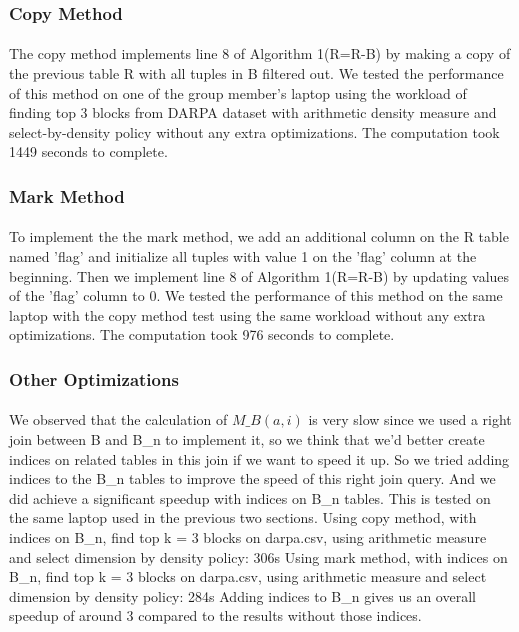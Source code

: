 \subsubsection{Copy Method}
\paragraph{} The copy method implements line 8 of Algorithm 1(R=R-B) by making a copy of the previous table R with all tuples in B filtered out. We tested the performance of this method on one of the group member's laptop
using the workload of finding top 3 blocks from DARPA dataset with arithmetic density measure and select-by-density policy without any extra optimizations. The computation took 1449 seconds to complete.
\subsubsection{Mark Method}
\paragraph{} To implement the the mark method, we add an additional column on the R table named 'flag' and initialize all tuples with value 1 on the 'flag' column at the beginning. Then we implement line 8 of Algorithm 1(R=R-B) by
updating values of the 'flag' column to 0. We tested the performance of this method on the same laptop with the copy method test using the same workload without any extra optimizations. The computation took 976 seconds to complete.
\subsubsection{Other Optimizations}
\paragraph{} We observed that the calculation of $M{\_}B(a,i)$ is very slow since we used a right join between B and B{\_}n to implement it, so we think that we’d better create indices on related tables in this join if we want to speed it up.
So we tried adding indices to the B{\_}n tables to improve the speed of this right join query. And we did achieve a significant speedup with indices on B{\_}n tables. This is tested on the same laptop used in the previous two sections.
Using copy method, with indices on B{\_}n, find top k = 3 blocks on darpa.csv, using arithmetic measure and select dimension by density policy: 306s
Using mark method, with indices on B{\_}n, find top k = 3 blocks on darpa.csv, using arithmetic measure and select dimension by density policy: 284s
Adding indices to B{\_}n gives us an overall speedup of around 3 compared to the results without those indices.
